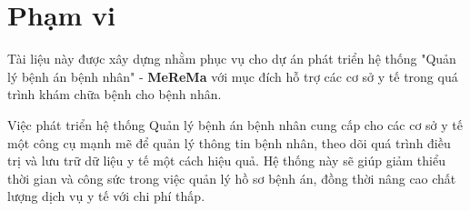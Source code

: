 \section{Phạm vi}

Tài liệu này được xây dựng nhằm phục vụ cho dự án phát triển hệ thống "Quản lý bệnh án bệnh nhân" - \textbf{MeReMa} với mục đích hỗ trợ các cơ sở y tế trong quá trình khám chữa bệnh cho bệnh nhân.

Việc phát triển hệ thống Quản lý bệnh án bệnh nhân cung cấp cho các cơ sở y tế một công cụ mạnh mẽ để quản lý thông tin bệnh nhân, theo dõi quá trình điều trị và lưu trữ dữ liệu y tế một cách hiệu quả. Hệ thống này sẽ giúp giảm thiểu thời gian và công sức trong việc quản lý hồ sơ bệnh án, đồng thời nâng cao chất lượng dịch vụ y tế với chi phí thấp. 